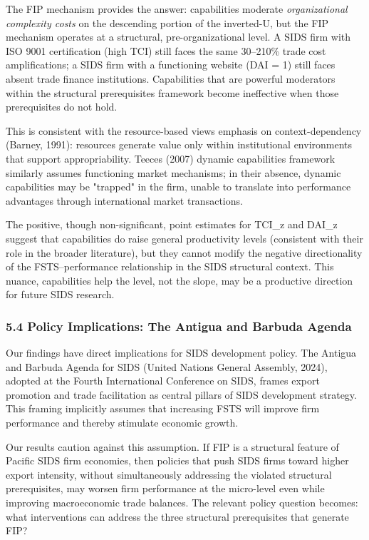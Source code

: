 \documentclass[12pt,a4paper]{article}
\begin{document}
The FIP mechanism provides the answer: capabilities moderate
\emph{organizational complexity costs} on the descending portion of the
inverted-U, but the FIP mechanism operates at a structural,
pre-organizational level. A SIDS firm with ISO 9001 certification (high
TCI) still faces the same 30--210\% trade cost amplifications; a SIDS
firm with a functioning website (DAI = 1) still faces absent trade
finance institutions. Capabilities that are powerful moderators within
the structural prerequisites framework become ineffective when those
prerequisites do not hold.

This is consistent with the resource-based view\textquotesingle s
emphasis on context-dependency (Barney, 1991): resources generate value
only within institutional environments that support appropriability.
Teece\textquotesingle s (2007) dynamic capabilities framework similarly
assumes functioning market mechanisms; in their absence, dynamic
capabilities may be "trapped" in the firm, unable to translate into
performance advantages through international market transactions.

The positive, though non-significant, point estimates for TCI\_z and
DAI\_z suggest that capabilities do raise general productivity levels
(consistent with their role in the broader literature), but they cannot
modify the negative directionality of the FSTS--performance relationship
in the SIDS structural context. This nuance, capabilities help the
level, not the slope, may be a productive direction for future SIDS
research.

\hypertarget{54-policy-implications-the-antigua-and-barbuda-agenda}{%
\subsubsection{5.4 Policy Implications: The Antigua and Barbuda
Agenda}\label{54-policy-implications-the-antigua-and-barbuda-agenda}}

Our findings have direct implications for SIDS development policy. The
Antigua and Barbuda Agenda for SIDS (United Nations General Assembly,
2024), adopted at the Fourth International Conference on SIDS, frames
export promotion and trade facilitation as central pillars of SIDS
development strategy. This framing implicitly assumes that increasing
FSTS will improve firm performance and thereby stimulate economic
growth.

Our results caution against this assumption. If FIP is a structural
feature of Pacific SIDS firm economies, then policies that push SIDS
firms toward higher export intensity, without simultaneously addressing
the violated structural prerequisites, may worsen firm performance at
the micro-level even while improving macroeconomic trade balances. The
relevant policy question becomes: what interventions can address the
three structural prerequisites that generate FIP?
\end{document}
